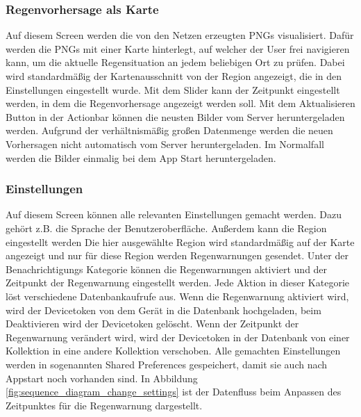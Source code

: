 \subsubsection*{Regenvorhersage als Karte}
Auf diesem Screen werden die von den Netzen erzeugten PNGs visualisiert. 
Dafür werden die PNGs mit einer Karte hinterlegt, auf welcher der User frei navigieren kann, 
um die aktuelle Regensituation an jedem beliebigen Ort zu prüfen. 
Dabei wird standardmäßig der Kartenausschnitt von der Region angezeigt, die in den Einstellungen eingestellt wurde. 
Mit dem Slider kann der Zeitpunkt eingestellt werden, in dem die Regenvorhersage angezeigt werden soll. 
Mit dem Aktualisieren Button in der Actionbar können die neusten Bilder vom Server heruntergeladen werden. 
Aufgrund der verhältnismäßig großen Datenmenge werden die neuen Vorhersagen nicht automatisch vom Server heruntergeladen. 
Im Normalfall werden die Bilder einmalig bei dem App Start heruntergeladen.

\subsubsection*{Einstellungen}
Auf diesem Screen können alle relevanten Einstellungen gemacht werden. Dazu gehört z.B. die Sprache der Benutzeroberfläche. 
Außerdem kann die Region eingestellt werden 
Die hier ausgewählte Region wird standardmäßig auf der Karte angezeigt und nur für diese Region werden Regenwarnungen gesendet. 
Unter der Benachrichtigungs Kategorie können die Regenwarnungen aktiviert und der Zeitpunkt der Regenwarnung eingestellt werden. 
Jede Aktion in dieser Kategorie löst verschiedene Datenbankaufrufe aus. 
Wenn die Regenwarnung aktiviert wird, wird der Devicetoken von dem Gerät in die Datenbank hochgeladen, beim Deaktivieren wird der Devicetoken gelöscht. 
Wenn der Zeitpunkt der Regenwarnung verändert wird, wird der Devicetoken in der Datenbank von einer Kollektion in eine andere Kollektion verschoben.   
Alle gemachten Einstellungen werden in sogenannten Shared Preferences gespeichert, damit sie auch nach Appstart noch vorhanden sind.   
In Abbildung \ref*{fig:sequence_diagram_change_settings} ist der Datenfluss beim Anpassen des Zeitpunktes für die Regenwarnung 
dargestellt. 

